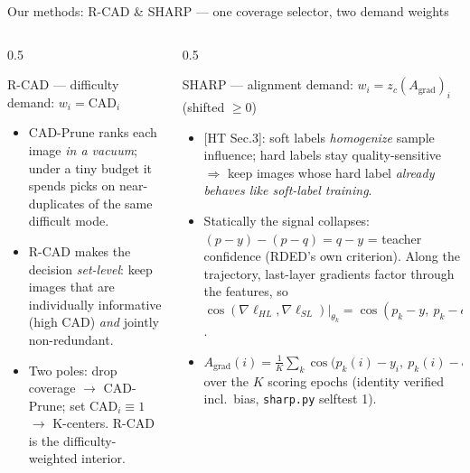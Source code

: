 \documentclass[aspectratio=169]{beamer}
\begin{document}
\begin{frame}{Our methods: R-CAD \& SHARP --- one coverage selector, two demand weights}
    \vspace{-0.1cm}
    \begin{columns}[t]
        \begin{column}{0.5\textwidth}
            \begin{block}{R-CAD --- difficulty demand: $w_i=\mathrm{CAD}_i$}
            \tiny
            \begin{itemize}\setlength\itemsep{1pt}
                \item CAD-Prune ranks each image \emph{in a vacuum}; under a tiny budget it spends picks on
                      near-duplicates of the same difficult mode.
                \item R-CAD makes the decision \emph{set-level}: keep images that are individually
                      informative (high CAD) \emph{and} jointly non-redundant.
                \item Two poles: drop coverage $\to$ CAD-Prune; set $\mathrm{CAD}_i\equiv 1$ $\to$
                      K-centers. R-CAD is the difficulty-weighted interior.
            \end{itemize}
            \end{block}
        \end{column}
        \begin{column}{0.5\textwidth}
            \begin{block}{SHARP --- alignment demand: $w_i = z_c(A_{\text{grad}})_i$ (shifted $\geq 0$)}
            \tiny
            \begin{itemize}\setlength\itemsep{1pt}
                \item {[HT Sec.3]}: soft labels \emph{homogenize} sample influence; hard labels stay
                      quality-sensitive $\Rightarrow$ keep images whose hard label \emph{already behaves
                      like soft-label training}.
                \item Statically the signal collapses: $(p-y)-(p-q)=q-y$ = teacher confidence (RDED's own
                      criterion). Along the trajectory, last-layer gradients factor through the features, so
                      $\cos(\nabla\ell_{HL},\nabla\ell_{SL})\big|_{\theta_k}=\cos(p_k-y,\ p_k-q)$.
                \item $A_{\text{grad}}(i)=\tfrac{1}{K}\sum_{k}\cos\big(p_k(i)-y_i,\ p_k(i)-q_i\big)$ over
                      the $K$ scoring epochs (identity verified incl.\ bias, \texttt{sharp.py} selftest 1).
            \end{itemize}
            \end{block}
        \end{column}
    \end{columns}


\end{frame}
\end{document}
